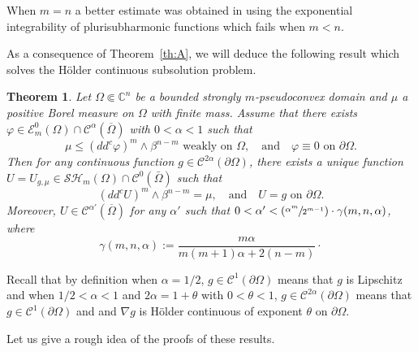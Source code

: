 \documentclass[JEP,XML,SOM,Unicode]{cedram}
\newcommand{\Psfrac}[2]{(\sfrac{#1}{#2})}
\newtheorem{theo}{Theorem}
\theoremstyle{definition}
\renewcommand{\C}{\mathbb{C}}
\newcommand{\Cc}{\mathcal{C}}
\begin{document}
When $m=n$ a better estimate was obtained in \cite{N18a} using the exponential integrability of plurisubharmonic functions which fails when $m < n$.

As a consequence of Theorem~\ref{th:A}, we will deduce the following result which solves the Hölder continuous subsolution problem.

\begin{theo}\label{th:B}
Let $\Omega \Subset \C^n$ be a bounded strongly $m$-pseudoconvex domain and $\mu $ a positive Borel measure on $\Omega$ with finite mass. Assume that there exists $\varphi\in \mathcal{E}^0_m(\Omega)\cap\Cc^{\alpha}(\overline\Omega)$ with $0 < \alpha < 1$ such that
\begin{equation} \label{eq:subsol}
\mu \leq (dd^c\varphi)^m\wedge\beta^{n-m} \text{ weakly on }\Omega, \quad \text{and}\quad \varphi \equiv 0 \text{ on }\partial \Omega.
\end{equation}
Then for any continuous function $g \in \Cc^{2 \alpha} (\partial \Omega)$, there exists a unique function $U = U_{g,\mu} \in \mathcal{SH}_m (\Omega) \cap \Cc^{0} (\bar{\Omega})$ such that
\[
(dd^c U)^m\wedge\beta^{n-m} = \mu, \quad\text{and}\quad U = g \text{ on } \partial \Omega.
\]
Moreover, $U \in \Cc^{\alpha'}(\overline\Omega)$ for any $\alpha'$ such that $0 < \alpha' < \Psfrac{\alpha^m}{2^{m - 1}}\cdot \gamma (m,n,\alpha)$, where
\[
\gamma (m,n,\alpha):= \frac{m \alpha}{ m (m + 1) \alpha + 2 (n-m)}\cdot
\]
\end{theo}

Recall that by definition when $\alpha = 1 \slash 2$, $g \in \Cc^1 (\partial \Omega)$ means that $g$ is Lipschitz and when $1 \slash 2 < \alpha <1$ and $2 \alpha = 1 + \theta$ with $0 < \theta < 1$, $ g \in \Cc^{2 \alpha} (\partial \Omega)$ means that $g \in \Cc^1 (\partial \Omega)$ and and $\nabla g$ is Hölder continuous of exponent $\theta$ on $\partial \Omega$.

Let us give a rough idea of the proofs of these results.
\end{document}

